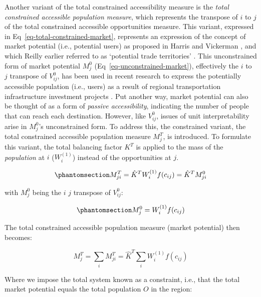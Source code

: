 \documentclass[
  10pt,
  letterpaper,
]{article}
\begin{document}
Another variant of the total constrained accessibility measure is the
\emph{total constrained accessible population measure}, which represents
the transpose of \(i\) to \(j\) of the total constrained accessible
opportunities measure. This variant, expressed in
Eq~\ref{eq-total-constrained-market}, represents an expression of the
concept of market potential (i.e., potential users) as proposed in
Harris \citep{harris_market_1954} and Vickerman
\citep{vickermanAccessibilityAttractionPotential1974}, and which Reilly
earlier referred to as `potential trade territories'
\citep{reilly1929methods}. This unconstrained form of market potential
\(M_j^0\) (Eq~\ref{eq-unconstrained-market}), effectively the \(i\) to
\(j\) transpose of \(V^0_{ij}\), has been used in recent research to
express the potentially accessible population (i.e., users) as a result
of regional transportation infrastructure investment projects
\citep[e.g.,][]{gutierrezLocationEconomicPotential2001, holl2007twenty, condecco2018road}.
Put another way, market potential can also be thought of as a form of
\emph{passive accessibility}, indicating the number of people that can
reach each destination. However, like \(V_{ij}^0\), issues of unit
interpretability arise in \(M_j^0\)'s unconstrained form. To address
this, the constrained variant, the total constrained accessible
population measure \(M^T_{j}\), is introduced. To formulate this
variant, the total balancing factor \(K^T\) is applied to the mass of
the \emph{population} at \(i\) (\(W_i^{(1)}\)) instead of the
opportunities at \(j\).

\begin{equation}\phantomsection\label{eq-total-constrained-market}{
M^T_{ji} = \hat K^T  W_i^{(1)} f(c_{ij}) = \hat K^T  M_{ji}^0
}\end{equation}

\noindent with \(M_j^0\) being the \(i\) \(j\) transpose of
\(V^0_{ij}\):

\begin{equation}\phantomsection\label{eq-unconstrained-market}{
M_j^0 = W_i^{(1)} f(c_{ij})
}\end{equation}

The total constrained accessible population measure (market potential)
then becomes:

\[
M^T_j = \sum_i M^T_{ji} = \hat K^T \sum_i W^{(1)}_if(c_{ij})
\]

Where we impose the total system known as a constraint, i.e., that the
total market potential equals the total population \(O\) in the region:
\end{document}

